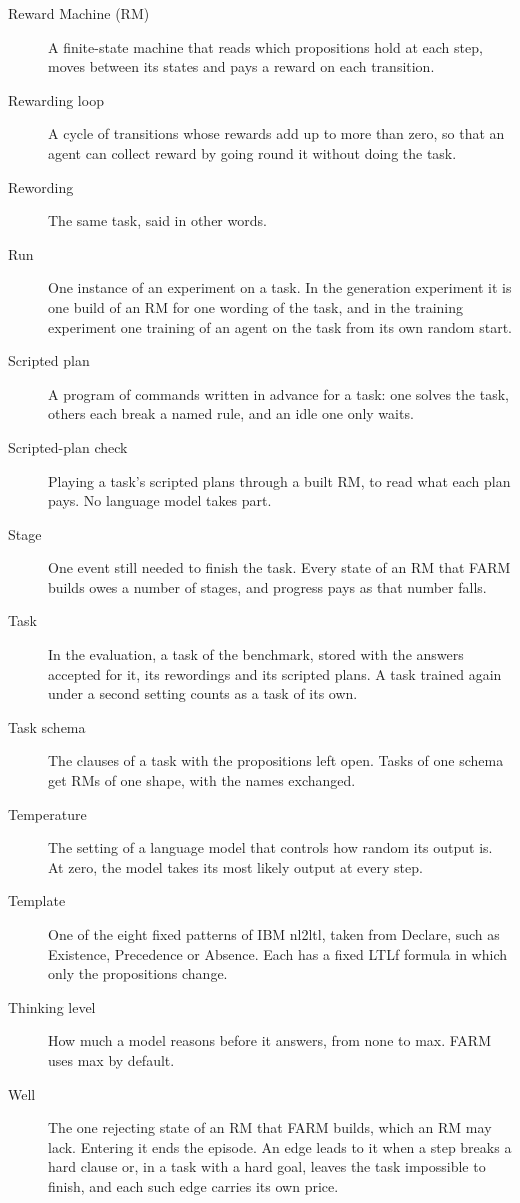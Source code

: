 \documentclass[11pt,english,listoffigures,listoftables]{tfgetsinf}
\begin{document}
\begin{description}
    \item[Reward Machine (RM)] A finite-state machine that reads which propositions hold at each step, moves between its states and pays a reward on each transition.
    \item[Rewarding loop] A cycle of transitions whose rewards add up to more than zero, so that an agent can collect reward by going round it without doing the task.
    \item[Rewording] The same task, said in other words.
    \item[Run] One instance of an experiment on a task. In the generation experiment it is one build of an RM for one wording of the task, and in the training experiment one training of an agent on the task from its own random start.
    \item[Scripted plan] A program of commands written in advance for a task: one solves the task, others each break a named rule, and an idle one only waits.
    \item[Scripted-plan check] Playing a task's scripted plans through a built RM, to read what each plan pays. No language model takes part.
    \item[Stage] One event still needed to finish the task. Every state of an RM that FARM builds owes a number of stages, and progress pays as that number falls.
    \item[Task] In the evaluation, a task of the benchmark, stored with the answers accepted for it, its rewordings and its scripted plans. A task trained again under a second setting counts as a task of its own.
    \item[Task schema] The clauses of a task with the propositions left open. Tasks of one schema get RMs of one shape, with the names exchanged.
    \item[Temperature] The setting of a language model that controls how random its output is. At zero, the model takes its most likely output at every step.
    \item[Template] One of the eight fixed patterns of IBM nl2ltl, taken from Declare, such as Existence, Precedence or Absence. Each has a fixed LTLf formula in which only the propositions change.
    \item[Thinking level] How much a model reasons before it answers, from none to max. FARM uses max by default.
    \item[Well] The one rejecting state of an RM that FARM builds, which an RM may lack. Entering it ends the episode. An edge leads to it when a step breaks a hard clause or, in a task with a hard goal, leaves the task impossible to finish, and each such edge carries its own price.
\end{description}
\end{document}

